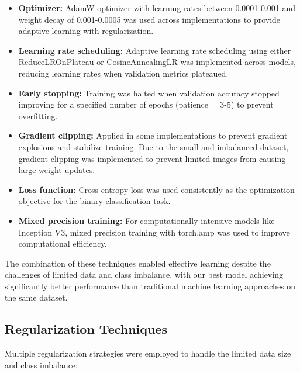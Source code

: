 \documentclass[a4paper,12pt]{report}
\begin{document}
\begin{itemize}
    \item \textbf{Optimizer:} AdamW optimizer with learning rates between 0.0001-0.001 and weight decay of 0.001-0.0005 was used across implementations to provide adaptive learning with regularization.
    
    \item \textbf{Learning rate scheduling:} Adaptive learning rate scheduling using either ReduceLROnPlateau or CosineAnnealingLR was implemented across models, reducing learning rates when validation metrics plateaued.
    
    \item \textbf{Early stopping:} Training was halted when validation accuracy stopped improving for a specified number of epochs (patience = 3-5) to prevent overfitting.\citep{Prechelt1998}
    
    \item \textbf{Gradient clipping:} Applied in some implementations to prevent gradient explosions and stabilize training. Due to the small and imbalanced dataset, gradient clipping was implemented to prevent limited images from causing large weight updates. 
    

    \item \textbf{Loss function:} Cross-entropy loss was used consistently as the optimization objective for the binary classification task.
    
    \item \textbf{Mixed precision training:} For computationally intensive models like Inception V3, mixed precision training with torch.amp was used to improve computational efficiency.
\end{itemize}

The combination of these techniques enabled effective learning despite the challenges of limited data and class imbalance, with our best model achieving significantly better performance than traditional machine learning approaches on the same dataset.

\subsection{Regularization Techniques}

Multiple regularization strategies were employed to handle the limited data size and class imbalance:
\end{document}
